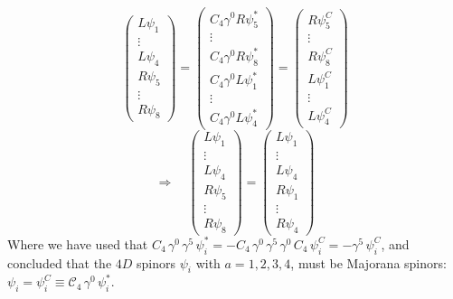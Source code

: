 \begin{equation*}
\left( \begin{array}{c}
L \psi_1 \\
\vdots \\
L \psi_4 \\
R \psi_5 \\
\vdots \\
R \psi_8
\end{array} \right)
%
=
%
\left( \begin{array}{c}
C_4 \gamma^0 R \psi_5^{*} \\
\vdots \\
C_4 \gamma^0 R \psi_8^{*} \\
C_4 \gamma^0 L \psi_1^{*} \\
\vdots \\
C_4 \gamma^0 L \psi_4^{*}
\end{array} \right)
%
=
%
\left( \begin{array}{c}
R \psi_5^{C} \\
\vdots \\
R \psi_8^{C} \\
L \psi_1^{C} \\
\vdots \\
L \psi_4^{C}
\end{array} \right)
%
\end{equation*}
%
%
\begin{equation}
\Rightarrow \quad
%
\left( \begin{array}{c}
L \psi_1 \\
\vdots \\
L \psi_4 \\
R \psi_5 \\
\vdots \\
R \psi_8
\end{array} \right)
%
=
%
\left( \begin{array}{c}
L \psi_1 \\
\vdots \\
L \psi_4 \\
R \psi_1 \\
\vdots \\
R \psi_4
\end{array} \right)
\end{equation}
%
%
Where we have used that $C_4 \, \gamma^0 \, \gamma^5 \, \psi_i^{*} = -C_4 \, \gamma^0 \, \gamma^5 \, \gamma^0 \, C_4 \, \psi_i^{C} = -\gamma^5 \, \psi_i^{C}$, and concluded that the $4D$ spinors $\psi_i$ with $a=1,2,3,4$, must be Majorana spinors: $\psi_i = \psi_i^{C} \equiv \mathcal{C}_{4} \, \gamma^0 \, \psi_i^{*}$.\\

